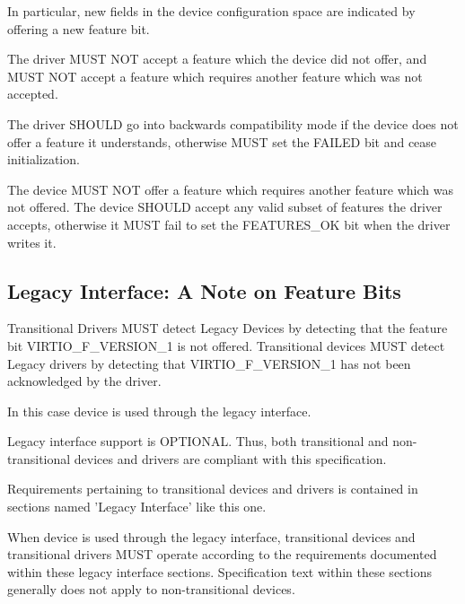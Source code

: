 In particular, new fields in the device configuration space are
indicated by offering a new feature bit.

The driver MUST NOT accept a feature which the device did not offer,
and MUST NOT accept a feature which requires another feature which was
not accepted.

The driver SHOULD go into backwards compatibility mode
if the device does not offer a feature it understands, otherwise MUST
set the FAILED  bit and cease initialization.

The device MUST NOT offer a feature which requires another feature
which was not offered.  The device SHOULD accept any valid subset
of features the driver accepts, otherwise it MUST fail to set the
FEATURES_OK  bit when the driver writes it.

\subsection{Legacy Interface: A Note on Feature
Bits}\label{sec:Basic Facilities of a Virtio Device / Feature
Bits / Legacy Interface: A Note on Feature Bits}

Transitional Drivers MUST detect Legacy Devices by detecting that
the feature bit VIRTIO_F_VERSION_1 is not offered.
Transitional devices MUST detect Legacy drivers by detecting that
VIRTIO_F_VERSION_1 has not been acknowledged by the driver.

In this case device is used through the legacy interface.

Legacy interface support is OPTIONAL.
Thus, both transitional and non-transitional devices and
drivers are compliant with this specification.

Requirements pertaining to transitional devices and drivers
is contained in sections named 'Legacy Interface' like this one.

When device is used through the legacy interface, transitional
devices and transitional drivers MUST operate according to the
requirements documented within these legacy interface sections.
Specification text within these sections generally does not apply
to non-transitional devices.


